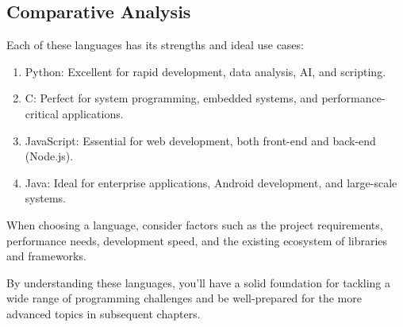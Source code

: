\hypertarget{comparative-analysis}{%
\subsection{Comparative Analysis}\label{comparative-analysis}}

Each of these languages has its strengths and ideal use cases:

\begin{enumerate}
\def\labelenumi{\arabic{enumi}.}
\tightlist
\item
  Python: Excellent for rapid development, data analysis, AI, and
  scripting.
\item
  C: Perfect for system programming, embedded systems, and
  performance-critical applications.
\item
  JavaScript: Essential for web development, both front-end and back-end
  (Node.js).
\item
  Java: Ideal for enterprise applications, Android development, and
  large-scale systems.
\end{enumerate}

When choosing a language, consider factors such as the project
requirements, performance needs, development speed, and the existing
ecosystem of libraries and frameworks.

By understanding these languages, you'll have a solid foundation for
tackling a wide range of programming challenges and be well-prepared for
the more advanced topics in subsequent chapters.


